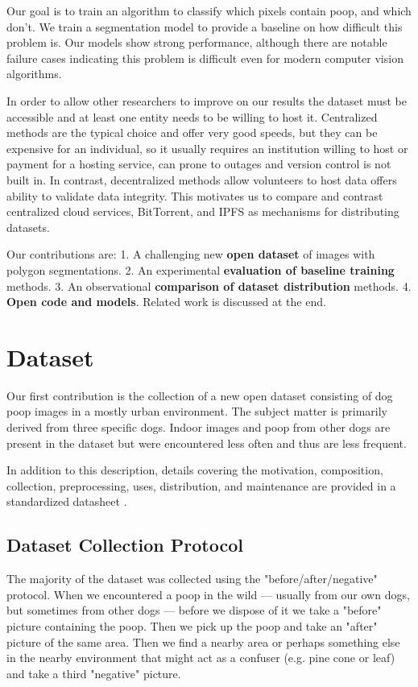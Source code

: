 \documentclass[10pt,twocolumn,letterpaper]{article}
\begin{document}
Our goal is to train an algorithm to classify which pixels contain poop, and
which don't. We train a segmentation model to provide a baseline on how
difficult this problem is. Our models show strong performance, although there
are notable failure cases indicating this problem is difficult even for modern
computer vision algorithms.

In order to allow other researchers to improve on our results the dataset must
be accessible and at least one entity needs to be willing to host it.
Centralized methods are the typical choice and offer very good speeds, 
but they can be expensive for an individual, so it usually requires an
institution willing to host or payment for a hosting service,
can prone to outages and version control is not built in.
In contrast, decentralized methods allow volunteers to host data offers ability
to validate data integrity. 
This motivates us to compare and contrast centralized cloud services,
BitTorrent, and IPFS as mechanisms for distributing datasets.



Our contributions are:
1. A challenging new \textbf{open dataset} of images with polygon segmentations.
2. An experimental \textbf{evaluation of baseline training} methods.
3. An observational \textbf{comparison of dataset distribution} methods.
4. \textbf{Open code and models}.
Related work is discussed at the end.


\section{Dataset}

Our first contribution is the collection of a new open dataset consisting of
dog poop images in a mostly urban environment. The subject matter is primarily
derived from three specific dogs. Indoor images and poop from other dogs are
present in the dataset but were encountered less often and thus are less
frequent.

In addition to this description, details covering the motivation, composition,
collection, preprocessing, uses, distribution, and maintenance are provided in
a standardized datasheet \cite{gebru_datasheets_2021}.

\subsection{Dataset Collection Protocol}
The majority of the dataset was collected using the "before/after/negative"
protocol.
When we encountered a poop in the wild --- usually from our own dogs, but
sometimes from other dogs --- before we dispose of it we 
take a "before" picture containing the poop.
Then we pick up the poop and take an "after" picture of the same area. 
Then we find a nearby area or perhaps something else in the nearby environment
that might act as a confuser (e.g. pine cone or leaf) and take a third
"negative" picture.
\end{document}
